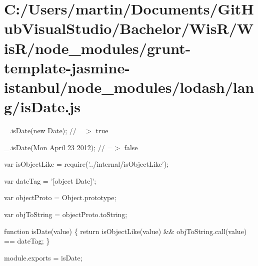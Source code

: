 \hypertarget{_c_1_2_users_2martin_2_documents_2_git_hub_visual_studio_2_bachelor_2_wis_r_2_wis_r_2node_modulec8a0507c0c2b86e2ef4a5fea0fbc8dbe}{}\section{C\+:/\+Users/martin/\+Documents/\+Git\+Hub\+Visual\+Studio/\+Bachelor/\+Wis\+R/\+Wis\+R/node\+\_\+modules/grunt-\/template-\/jasmine-\/istanbul/node\+\_\+modules/lodash/lang/is\+Date.\+js}
\+\_\+.\+is\+Date(new Date); // =$>$ true

\+\_\+.\+is\+Date(\textquotesingle{}Mon April 23 2012\textquotesingle{}); // =$>$ false


\begin{DoxyCodeInclude}
var isObjectLike = require(\textcolor{stringliteral}{'../internal/isObjectLike'});

var dateTag = \textcolor{stringliteral}{'[object Date]'};

var objectProto = Object.prototype;

var objToString = objectProto.toString;

\textcolor{keyword}{function} isDate(value) \{
  \textcolor{keywordflow}{return} isObjectLike(value) && objToString.call(value) == dateTag;
\}

module.exports = isDate;
\end{DoxyCodeInclude}
 